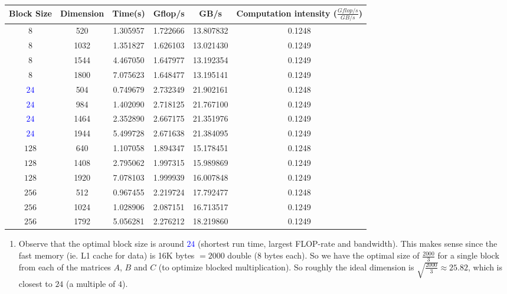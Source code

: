 \documentclass[11pt]{article}
\begin{document}
\begin{enumerate}
\begin{enumerate}
        \begin{tabular}{c|c|c|c|c|c}
           Block Size & Dimension & Time(s) & Gflop/s & GB/s & Computation intensity ($\frac{Gflop/s}{GB/s}$) \\ \hline
            $8$ & 520 & 1.305957 & 1.722666 & 13.807832 & 0.1248 \\
            $8$ & 1032 & 1.351827 & 1.626103 & 13.021430 & 0.1249 \\
            $8$ & 1544 & 4.467050 & 1.647977 & 13.192354 & 0.1249 \\
            $8$ & 1800 & 7.075623 & 1.648477 & 13.195141 & 0.1249 \\ \hline
            \textcolor{blue}{$24$} & 504 & 0.749679 & 2.732349 & 21.902161 & 0.1248 \\
            \textcolor{blue}{$24$} & 984 & 1.402090 & 2.718125 & 21.767100 & 0.1249 \\
            \textcolor{blue}{$24$} & 1464 & 2.352890 & 2.667175 & 21.351976 & 0.1249 \\
            \textcolor{blue}{$24$} & 1944 & 5.499728 & 2.671638 & 21.384095 & 0.1249 \\ \hline
            $128$ & 640 & 1.107058 & 1.894347 & 15.178451 & 0.1248 \\
            $128$ & 1408 & 2.795062 & 1.997315 & 15.989869 & 0.1249 \\
            $128$ & 1920 & 7.078103 & 1.999939 & 16.007848 & 0.1249 \\ \hline
            $256$ & 512 & 0.967455 & 2.219724 & 17.792477 & 0.1248 \\
            $256$ & 1024 & 1.028906 & 2.087151 & 16.713517 & 0.1249 \\
            $256$ & 1792 & 5.056281 & 2.276212 & 18.219860 & 0.1249 \\ \hline
            \end{tabular}
            \begin{enumerate}
                \item Observe that the optimal block size is around \textcolor{blue}{$24$} (shortest run time, largest FLOP-rate and bandwidth). This makes sense since the fast memory (ie. L1 cache for data) is 16K bytes $= 2000$ double (8 bytes each). So we have the optimal size of $\frac{2000}{3}$ for a single block from each of the matrices $A$, $B$ and $C$ (to optimize blocked multiplication). So roughly the ideal dimension is $\sqrt{\frac{2000}{3}} \approx 25.82$, which is closest to $24$ (a multiple of $4$). 
                

\end{enumerate}
\end{enumerate}
\end{enumerate}
\end{document}
